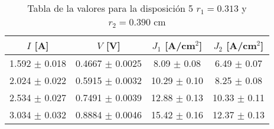 \begin{table}[H]
    \centering
\begin{tabular}{cccc}
\toprule
$I$ [A] & $V$ [V] & $J_1$ [A/cm$^2$] & $J_2$ [A/cm$^2$] \\
\midrule
1.592 $\pm$ 0.018 & 0.4667 $\pm$ 0.0025 & 8.09 $\pm$ 0.08 & 6.49 $\pm$ 0.07 \\
2.024 $\pm$ 0.022 & 0.5915 $\pm$ 0.0032 & 10.29 $\pm$ 0.10 & 8.25 $\pm$ 0.08 \\
2.534 $\pm$ 0.027 & 0.7491 $\pm$ 0.0039 & 12.88 $\pm$ 0.13 & 10.33 $\pm$ 0.11 \\
3.034 $\pm$ 0.032 & 0.8884 $\pm$ 0.0046 & 15.42 $\pm$ 0.16 & 12.37 $\pm$ 0.13 \\
\bottomrule
\end{tabular}
    \caption{Tabla de la valores para la disposición 5 $r_1=0.313$ y $r_2= 0.390 $ cm }
    \label{Tab:VIJ_5}
\end{table}
